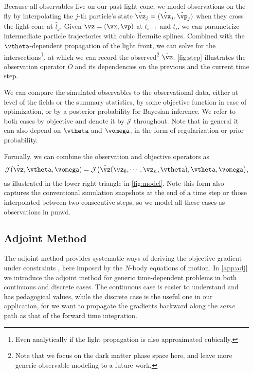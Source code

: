 \documentclass[modern, trackchanges, dvipsnames]{aastex631}
\newcommand{\pmwd}{{\usefont{T1}{nova}{m}{sl}pmwd}}
\newcommand{\cJ}{\mathcal{J}}
\begin{document}
Because all observables live on our past light cone, we model
observations on the fly by interpolating the $j$-th particle's state
$\hat\vz_j = (\hat\vx_j, \hat\vp_j)$ when they cross the light cone at
$\hat t_j$.
Given $\vz = (\vx, \vp)$ at $t_{i-1}$ and $t_i$, we can parametrize
intermediate particle trajectories with cubic Hermite splines.
Combined with the $\vtheta$-dependent propagation of the light front, we
can solve for the intersections\footnote{Even analytically if the light
propagation is also approximated cubically.}, at which we can record the
observed\footnote{Note that we focus on the dark matter phase space
here, and leave more generic observable modeling to a future work.}
$\hat\vz$.
\autoref{fig:step} illustrates the observation operator $O$ and its
dependencies on the previous and the current time step.

We can compare the simulated observables to the observational data,
either at level of the fields or the summary statistics, by some
objective function in case of optimization, or by a posterior
probability for Bayesian inference.
We refer to both cases by objective and denote it by $\cJ$ throughout.
Note that in general it can also depend on $\vtheta$ and $\vomega$, in
the form of regularization or prior probability.

Formally, we can combine the observation and objective operators as
%
\begin{equation}
\cJ(\hat\vz, \vtheta, \vomega)
  = \cJ \bigl(
    \hat\vz(\vz_0, \cdots, \vz_n, \vtheta), \vtheta, \vomega
  \bigr),
\label{O}
\end{equation}
%
as illustrated in the lower right triangle in \autoref{fig:model}.
Note this form also captures the conventional simulation snapshots at
the end of a time step or those interpolated between two consecutive
steps, so we model all these cases as observations in \pmwd.


\vspace{1em}
\subsection{Adjoint Method}
\label{sec:adj}

The adjoint method provides systematic ways of deriving the objective
gradient under constraints \citep{Pontryagin1962}, here imposed by the
$N$-body equations of motion.
In \autoref{app:adj} we introduce the adjoint method for generic
time-dependent problems in both continuous and discrete cases.
The continuous case is easier to understand and has pedagogical values,
while the discrete case is the useful one in our application, for we
want to propagate the gradients backward along the \emph{same} path as
that of the forward time integration.
\end{document}
